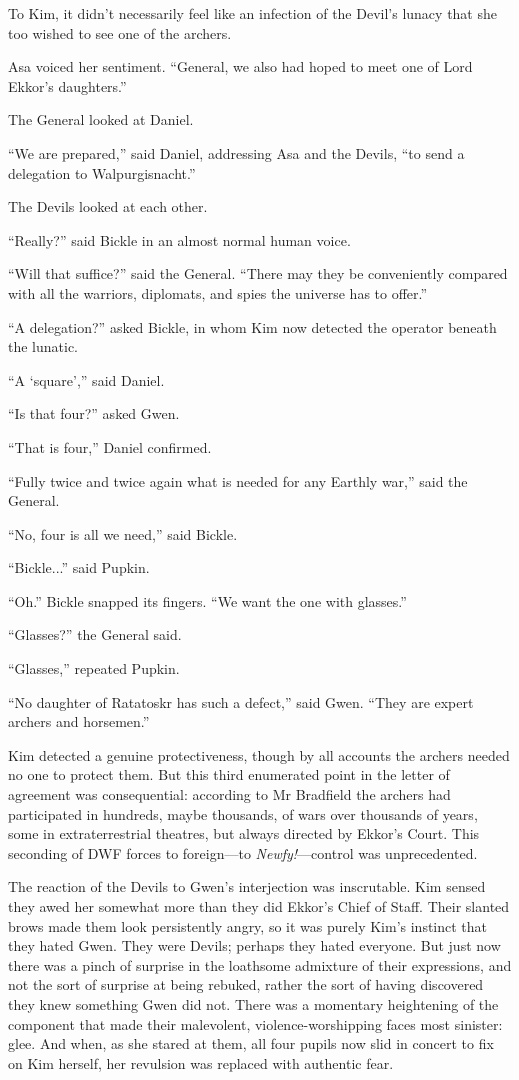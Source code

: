 \documentclass[11pt,a5paper]{article}
\begin{document}
To Kim, it didn't necessarily feel like an infection of the Devil's lunacy that she too wished to see one of the archers.

Asa voiced her sentiment. ``General, we also had hoped to meet one of Lord Ekkor's daughters.''

The General looked at Daniel.

``We are prepared,'' said Daniel, addressing Asa and the Devils, ``to send a delegation to Walpurgisnacht.''

The Devils looked at each other.

``Really?'' said Bickle in an almost normal human voice.

``Will that suffice?'' said the General. ``There may they be conveniently compared with all the warriors, diplomats, and spies the universe has to offer.''

``A delegation?'' asked Bickle, in whom Kim now detected the operator beneath the lunatic.

``A `square','' said Daniel.

``Is that four?'' asked Gwen.

``That is four,'' Daniel confirmed.

``Fully twice and twice again what is needed for any Earthly war,'' said the General.

``No, four is all we need,'' said Bickle.

``Bickle...'' said Pupkin.

``Oh.'' Bickle snapped its fingers. ``We want the one with glasses.''

``Glasses?'' the General said.

``Glasses,'' repeated Pupkin.

``No daughter of Ratatoskr has such a defect,'' said Gwen. ``They are expert archers and horsemen.''

Kim detected a genuine protectiveness, though by all accounts the archers needed no one to protect them. But this third enumerated point in the letter of agreement was consequential: according to Mr Bradfield the archers had participated in hundreds, maybe thousands, of wars over thousands of years, some in extraterrestrial theatres, but always directed by Ekkor's Court. This seconding of DWF forces to foreign---to \emph{Newfy!}---control was unprecedented.

The reaction of the Devils to Gwen's interjection was inscrutable. Kim sensed they awed her somewhat more than they did Ekkor's Chief of Staff. Their slanted brows made them look persistently angry, so it was purely Kim's instinct that they hated Gwen. They were Devils; perhaps they hated everyone. But just now there was a pinch of surprise in the loathsome admixture of their expressions, and not the sort of surprise at being rebuked, rather the sort of having discovered they knew something Gwen did not. There was a momentary heightening of the component that made their malevolent, violence-worshipping faces most sinister: glee. And when, as she stared at them, all four pupils now slid in concert to fix on Kim herself, her revulsion was replaced with authentic fear.
\end{document}
